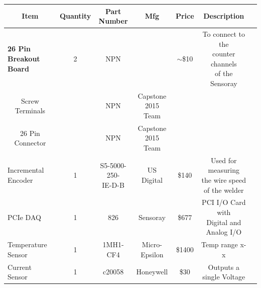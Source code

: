 \documentclass[12pt]{article}
\begin{document}
\begin{adjustwidth}{-2cm}{-2cm}

\begin{center}


\begin{tabular}{ |c|c|c|c|c|c|c| }


  \hline
  
  \textbf{Item} & \textbf{Quantity} & \thead{Part \\ Number} & \textbf{Mfg} & \textbf{Price} & \textbf{Description} \\  \hline
  
 
\multicolumn{1}{|l|}{\textbf{26 Pin Breakout Board}} & 2 & NPN & & $\sim$\$10 & \makecell{To connect to the \\ counter channels \\ of the Sensoray} \\ \hline  
  \multicolumn{1}{|c|}{Screw Terminals} & & NPN & \makecell{Capstone 2015 \\ Team} & & \\ \hline  
  \multicolumn{1}{|c|}{26 Pin Connector} & & NPN & \makecell{Capstone 2015 \\ Team} & & \\ \hline  \hline
  	  
  	  
 \multicolumn{1}{|l|}{Incremental Encoder} & 1 & \makecell{S5-5000-250-\\IE-D-B} & \makecell{US \\ Digital} & \$140 & \makecell{Used for measuring \\ the wire speed \\ of the welder}   \\ \hline  

  
  \multicolumn{1}{|l|}{PCIe DAQ} & 1 & 826 & Sensoray & \$677 & \makecell{PCI I/O Card with \\ Digital and Analog I/O}   \\ \hline  
  
  \multicolumn{1}{|l|}{Temperature Sensor} & 1 & 1MH1-CF4 & \makecell{Micro-\\Epsilon} & \$1400 & Temp range x-x    \\ \hline  
  
  \multicolumn{1}{|l|}{Current Sensor} & 1 & c20058 & Honeywell & \$30 &  Outputs a single Voltage  \\ \hline
  
  
   
 
 

\end{tabular}
\end{center}
\end{adjustwidth}
\end{document}
